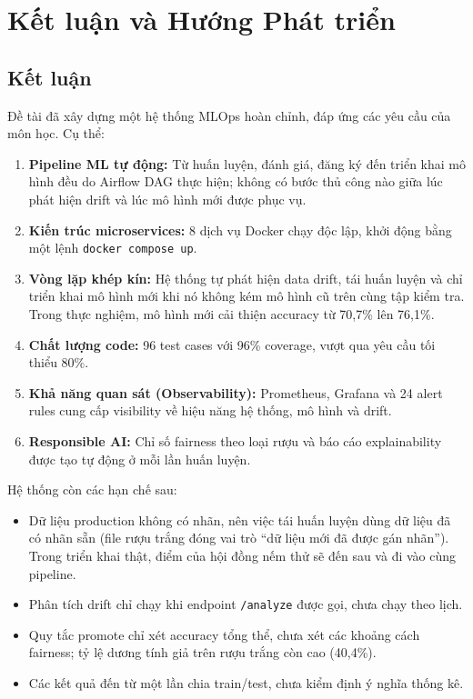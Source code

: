 \documentclass[12pt,a4paper]{report}
\begin{document}
\chapter{Kết luận và Hướng Phát triển}

\section{Kết luận}

Đề tài đã xây dựng một hệ thống MLOps hoàn chỉnh, đáp ứng các yêu cầu của môn học. Cụ thể:

\begin{enumerate}
  \item \textbf{Pipeline ML tự động:} Từ huấn luyện, đánh giá, đăng ký đến triển khai mô hình đều do Airflow DAG thực hiện; không có bước thủ công nào giữa lúc phát hiện drift và lúc mô hình mới được phục vụ.

  \item \textbf{Kiến trúc microservices:} 8 dịch vụ Docker chạy độc lập, khởi động bằng một lệnh \texttt{docker compose up}.

  \item \textbf{Vòng lặp khép kín:} Hệ thống tự phát hiện data drift, tái huấn luyện và chỉ triển khai mô hình mới khi nó không kém mô hình cũ trên cùng tập kiểm tra. Trong thực nghiệm, mô hình mới cải thiện accuracy từ 70,7\% lên 76,1\%.

  \item \textbf{Chất lượng code:} 96 test cases với 96\% coverage, vượt qua yêu cầu tối thiểu 80\%.

  \item \textbf{Khả năng quan sát (Observability):} Prometheus, Grafana và 24 alert rules cung cấp visibility về hiệu năng hệ thống, mô hình và drift.

  \item \textbf{Responsible AI:} Chỉ số fairness theo loại rượu và báo cáo explainability được tạo tự động ở mỗi lần huấn luyện.
\end{enumerate}

Hệ thống còn các hạn chế sau:
\begin{itemize}
  \item Dữ liệu production không có nhãn, nên việc tái huấn luyện dùng dữ liệu đã có nhãn sẵn (file rượu trắng đóng vai trò ``dữ liệu mới đã được gán nhãn''). Trong triển khai thật, điểm của hội đồng nếm thử sẽ đến sau và đi vào cùng pipeline.
  \item Phân tích drift chỉ chạy khi endpoint \texttt{/analyze} được gọi, chưa chạy theo lịch.
  \item Quy tắc promote chỉ xét accuracy tổng thể, chưa xét các khoảng cách fairness; tỷ lệ dương tính giả trên rượu trắng còn cao (40,4\%).
  \item Các kết quả đến từ một lần chia train/test, chưa kiểm định ý nghĩa thống kê.
\end{itemize}
\end{document}
